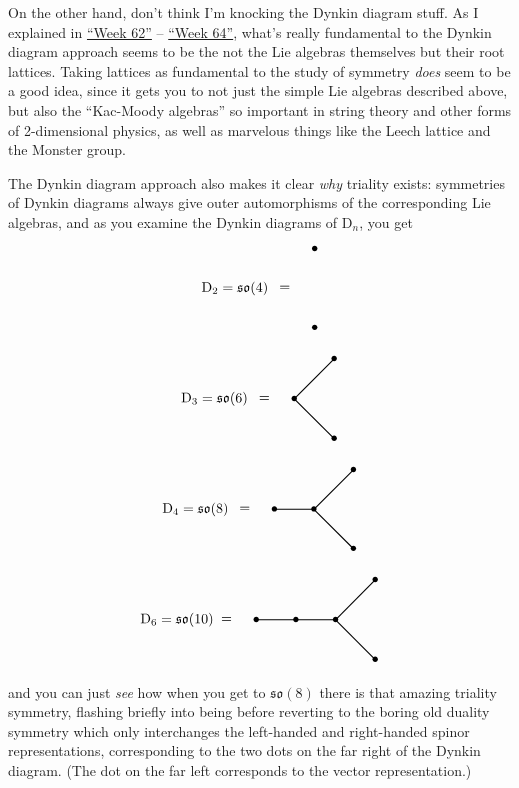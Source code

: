 \documentclass{article}
\begin{document}
On the other hand, don't think I'm knocking the Dynkin diagram stuff. As
I explained in \href{week62.html}{``Week 62''} --
\protect\hyperlink{week64}{``Week 64''}, what's really fundamental to
the Dynkin diagram approach seems to be the not the Lie algebras
themselves but their root lattices. Taking lattices as fundamental to
the study of symmetry \emph{does} seem to be a good idea, since it gets
you to not just the simple Lie algebras described above, but also the
``Kac-Moody algebras'' so important in string theory and other forms of
2-dimensional physics, as well as marvelous things like the Leech
lattice and the Monster group.

The Dynkin diagram approach also makes it clear \emph{why} triality
exists: symmetries of Dynkin diagrams always give outer automorphisms of
the corresponding Lie algebras, and as you examine the Dynkin diagrams
of \(\mathrm{D}_n\), you get \[
  \begin{tikzpicture}
    \node at (2,0) {$\mathrm{D}_2=\mathfrak{so}(4)$};
    \node at (3.25,0) {$=$};
    \draw[thick] (4,1) node {$\bullet$};
    \draw[thick] (4,-1) node {$\bullet$};
  \end{tikzpicture}
\] \[
  \begin{tikzpicture}
    \node at (1,0) {$\mathrm{D}_3=\mathfrak{so}(6)$};
    \node at (2.25,0) {$=$};
    \draw[thick] (3,0) node {$\bullet$};
    \draw[thick] (3,0) to (4,1) node {$\bullet$};
    \draw[thick] (3,0) to (4,-1) node {$\bullet$};
  \end{tikzpicture}
\] \[
  \begin{tikzpicture}
    \node at (0,0) {$\mathrm{D}_4=\mathfrak{so}(8)$};
    \node at (1.25,0) {$=$};
    \draw[thick] (2,0) node{$\bullet$} to (3,0) node {$\bullet$};
    \draw[thick] (3,0) to (4,1) node {$\bullet$};
    \draw[thick] (3,0) to (4,-1) node {$\bullet$};
  \end{tikzpicture}
\] \[
  \begin{tikzpicture}
    \node at (-1,0) {$\mathrm{D}_6=\mathfrak{so}(10)$};
    \node at (0.25,0) {$=$};
    \draw[thick] (1,0) node{$\bullet$} to (2,0) node{$\bullet$} to (3,0) node {$\bullet$};
    \draw[thick] (3,0) to (4,1) node {$\bullet$};
    \draw[thick] (3,0) to (4,-1) node {$\bullet$};
  \end{tikzpicture}
\] and you can just \emph{see} how when you get to \(\mathfrak{so}(8)\)
there is that amazing triality symmetry, flashing briefly into being
before reverting to the boring old duality symmetry which only
interchanges the left-handed and right-handed spinor representations,
corresponding to the two dots on the far right of the Dynkin diagram.
(The dot on the far left corresponds to the vector representation.)
\end{document}
